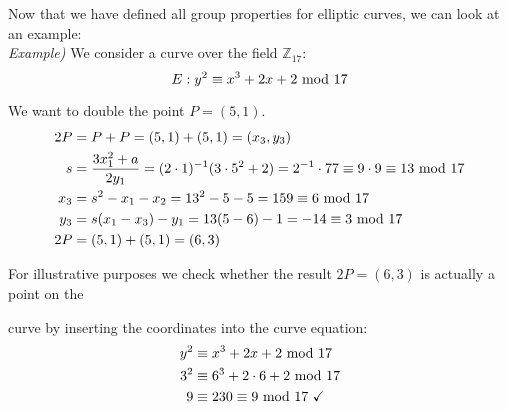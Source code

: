 \newpage
\hfill\break
Now that we have defined all group properties for elliptic curves, we can look at an example:\\

\textit{Example)} We consider a curve over the field $\mathbb{Z}_{17}$:
$$E:y^2\equiv x^3+2x+2\text{ mod } 17$$

We want to double the point $P=(5,1)$.
\begin{align*}
    2P&=P+P=(5,1)+(5,1)=(x_3,y_3)\\
    s&=\dfrac{3x_1^2+a}{2y_1}=(2\cdot1)^{-1}(3\cdot5^2+2)=2^{-1}\cdot77\equiv9\cdot9\equiv13\text{ mod } 17\\
    x_3&=s^2-x_1-x_2=13^2-5-5=159\equiv6\text{ mod }17\\
    y_3&=s(x_1-x_3)-y_1=13(5-6)-1=-14\equiv3\text{ mod }17\\
    2P&=(5,1)+(5,1)=(6,3)
\end{align*}

For illustrative purposes we check whether the result $2P=(6,3)$ is actually a point on the

curve by inserting the coordinates into the curve equation:
\begin{align*}
    y^2&\equiv x^3+2x+2\text{ mod }17\\
    3^2&\equiv6^3+2\cdot6+2\text{ mod }17\\
    9&\equiv230\equiv9\text{ mod } 17 \text{ \checkmark}
\end{align*}


